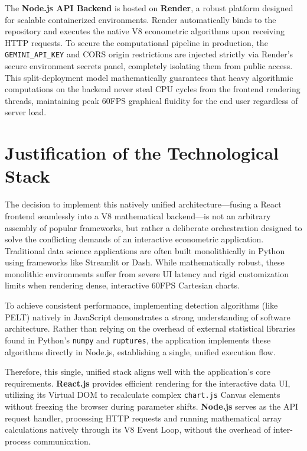 The \textbf{Node.js API Backend} is hosted on \textbf{Render}, a robust platform designed for scalable containerized environments. Render automatically binds to the repository and executes the native V8 econometric algorithms upon receiving HTTP requests. To secure the computational pipeline in production, the \texttt{GEMINI\_API\_KEY} and CORS origin restrictions are injected strictly via Render's secure environment secrets panel, completely isolating them from public access. This split-deployment model mathematically guarantees that heavy algorithmic computations on the backend never steal CPU cycles from the frontend rendering threads, maintaining peak 60FPS graphical fluidity for the end user regardless of server load.

\section{Justification of the Technological Stack}
The decision to implement this natively unified architecture—fusing a React frontend seamlessly into a V8 mathematical backend—is not an arbitrary assembly of popular frameworks, but rather a deliberate orchestration designed to solve the conflicting demands of an interactive econometric application. Traditional data science applications are often built monolithically in Python using frameworks like Streamlit or Dash. While mathematically robust, these monolithic environments suffer from severe UI latency and rigid customization limits when rendering dense, interactive 60FPS Cartesian charts. 

To achieve consistent performance, implementing detection algorithms (like PELT) natively in JavaScript demonstrates a strong understanding of software architecture. Rather than relying on the overhead of external statistical libraries found in Python's \texttt{numpy} and \texttt{ruptures}, the application implements these algorithms directly in Node.js, establishing a single, unified execution flow.

Therefore, this single, unified stack aligns well with the application's core requirements. \textbf{React.js} provides efficient rendering for the interactive data UI, utilizing its Virtual DOM to recalculate complex \texttt{chart.js} Canvas elements without freezing the browser during parameter shifts. \textbf{Node.js} serves as the API request handler, processing HTTP requests and running mathematical array calculations natively through its V8 Event Loop, without the overhead of inter-process communication.
